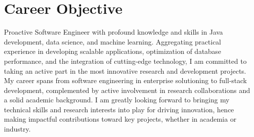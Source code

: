 \section{\textbf{Career Objective}}
Proactive Software Engineer with profound knowledge and skills in Java development, data science, and machine learning. Aggregating practical experience in developing scalable applications, optimization of database performance, and the integration of cutting-edge technology, I am committed to taking an active part in the most innovative research and development projects. My career spans from software engineering in enterprise solutioning to full-stack development, complemented by active involvement in research collaborations and a solid academic background. I am greatly looking forward to bringing my technical skills and research interests into play for driving innovation, hence making impactful contributions toward key projects, whether in academia or industry.
